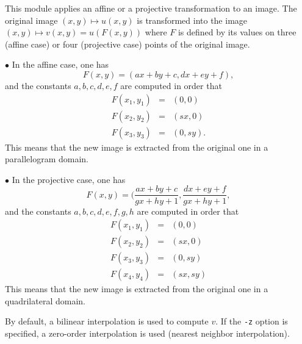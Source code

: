 This module applies an affine or a projective transformation to an image.
The original image $(x,y)\mapsto u(x,y)$ is transformed into the image
$(x,y)\mapsto v(x,y)=u(F(x,y))$ where $F$ is defined by its values on three
(affine case) or four (projective case) points of the original 
image. 

\medskip

$\bullet$ In the affine case, one has
$$F(x,y) = (a x + b y +c, d x +  e y + f),$$
and the constants $a,b,c,d,e,f$ are computed in order that
\begin{eqnarray*}
F(x_1,y_1) &=& (0,0) \\
F(x_2,y_2) &=& (sx,0) \\
F(x_3,y_3) &=& (0,sy) .
\end{eqnarray*}
This means that the new image is extracted from the original one 
in a parallelogram domain.

\medskip

$\bullet$ In the projective case, one has
$$F(x,y) = (\frac{a x + b y +c}{gx + hy +1}, 
\frac{d x + e y + f}{gx + hy +1},$$
and the constants $a,b,c,d,e,f,g,h$ are computed in order that
\begin{eqnarray*}
F(x_1,y_1) &=& (0,0) \\
F(x_2,y_2) &=& (sx,0) \\
F(x_3,y_3) &=& (0,sy) \\
F(x_4,y_4) &=& (sx,sy) 
\end{eqnarray*}
This means that the new image is extracted from the original one 
in a quadrilateral domain.

\medskip

By default, a bilinear interpolation is used to compute $v$.
If the \verb+-z+ option is specified, a zero-order interpolation
is used (nearest neighbor interpolation).




